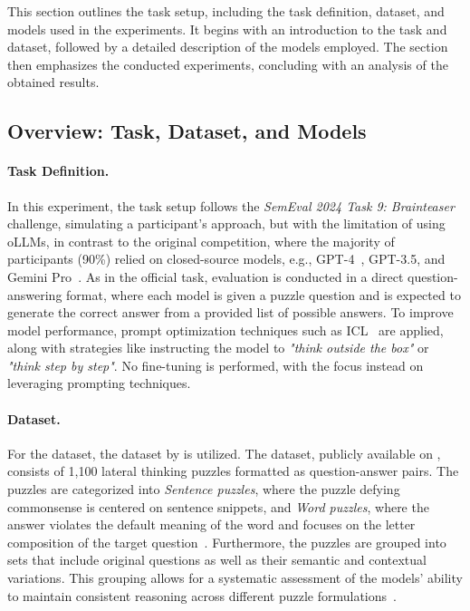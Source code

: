 This section outlines the task setup, including the task definition, dataset, and models used in the experiments. It begins with an introduction to the task and dataset, followed by a detailed description of the models employed. The section then emphasizes the conducted experiments, concluding with an analysis of the obtained results.

\subsection{Overview: Task, Dataset, and Models}

\paragraph{Task Definition.}
In this experiment, the task setup follows the \textit{SemEval 2024 Task 9: Brainteaser}~\cite{jiangBRAINTEASERLateralThinking2023} challenge, simulating a participant's approach, but with the limitation of using \acp{oLLM}, in contrast to the original competition, where the majority of participants (90\%) relied on closed-source models, e.g., \acs{GPT}-4~\cite{openaiGPT4TechnicalReport2024}, \acs{GPT}-3.5, and Gemini Pro~\cite{teamGeminiFamilyHighly2024}. As in the official task, evaluation is conducted in a direct question-answering format, where each model is given a puzzle question and is expected to generate the correct answer from a provided list of possible answers. To improve model performance, prompt optimization techniques such as \ac{ICL}~\cite{brownLanguageModelsAre2020} are applied, along with strategies like instructing the model to \textit{"think outside the box"} or \textit{"think step by step"}. No fine-tuning is performed, with the focus instead on leveraging prompting techniques.

\paragraph{Dataset.}
For the dataset, the  dataset by \citeauthor{jiangBRAINTEASERLateralThinking2023} is utilized. The dataset, publicly available on , consists of 1,100 lateral thinking puzzles formatted as question-answer pairs. The puzzles are categorized into \textit{Sentence puzzles}, where the puzzle defying commonsense is centered on sentence snippets, and \textit{Word puzzles}, where the answer violates the default meaning of the word and focuses on the letter composition of the target question~\cite{jiangBRAINTEASERLateralThinking2023}. Furthermore, the puzzles are grouped into sets that include original questions as well as their semantic and contextual variations. This grouping allows for a systematic assessment of the models' ability to maintain consistent reasoning across different puzzle formulations~\cite{jiangBRAINTEASERLateralThinking2023}.


